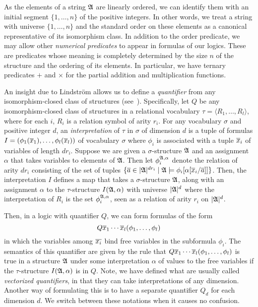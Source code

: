 \documentclass[a4paper,UKenglish,cleveref, autoref, thm-restate, anonymous]{lipics-v2021}
\begin{document}
As the elements of a string $\mathfrak{A}$ are linearly ordered, we can identify them with an initial segment $\{1,\ldots,n\}$ of the positive integers.  In other words, we treat a string with universe $\{1,\ldots,n\}$ and the standard order on these elements as a canonical representative of its isomorphism class.  In addition to the order predicate, we may allow other \emph{numerical predicates} to appear in formulas of our logics.  These are predicates whose meaning is completely determined by the size $n$ of the structure and the ordering of its elements.  In particular, we have ternary predicates $+$ and $\times$ for the partial addition and multiplication functions.

An insight due to Lindstr\"om allows us to define a \emph{quantifier} from any isomorphism-closed class of structures (see~\cite{Ebb85}).  Specifically, let $Q$ be any isomorphism-closed class of structures in a relational vocabulary $\tau = \langle R_1,\ldots,R_l\rangle$, where for each $i$, $R_i$ is a relation symbol of arity $r_i$.  For any vocabulary $\sigma$ and positive integer $d$, an \emph{interpretation} of $\tau$ in $\sigma$ of dimension $d$ is a tuple of formulas $I = (\phi_1(\overline{x}_1),\dots, \phi_l(\overline{x}_l))$ of vocabulary $\sigma$ where $\phi_i$ is associated with a tuple $\overline{x}_i$ of variables of length $dr_i$.  Suppose we are given a $\sigma$-structure $\mathfrak{A}$ and an assignment $\alpha$ that takes variables to elements of $\mathfrak{A}$.  Then let $\phi_i^{\mathfrak{A},\alpha}$ denote the relation of arity $dr_i$ consisting of the set of tuples $\{\overline{a} \in |\mathfrak{A}|^{dr_i} \mid \mathfrak{A} \models \phi_i[\alpha[\overline{x}_i/\overline{a}]] \}$.  Then, the interpretation $I$ defines a map that takes a $\sigma$-structure $\mathfrak{A}$, along with an assignment $\alpha$ to the  $\tau$-structure $I(\mathfrak{A},\alpha)$ with universe $|\mathfrak{A}|^d$ where the interpretation of $R_i$ is the set $\phi_i^{\mathfrak{A},\alpha}$, seen as a relation of arity $r_i$ on $|\mathfrak{A}|^d$.

Then, in a logic with quantifier $Q$, we can form formulas of the form
$$Q \overline{x}_1\cdots \overline{x}_l (\phi_1,\ldots,\phi_l)$$
in which the variables among $\overline{x_i}$ bind free variables in the subformula $\phi_i$.  The semantics of this quantifier are given by the rule that 
$Q \overline{x}_1\cdots \overline{x}_l (\phi_1,\ldots,\phi_l)$ is true in a structure $\mathfrak{A}$ under some interpretation $\alpha$ of values to the free variables if the $\tau$-structure $I(\mathfrak{A},\alpha)$ is in $Q$.  Note, we have defined what are usually called \emph{vectorized quantifiers}, in that they can take interpretations of any dimension.  Another way of formulating this is to have a separate quantifier $Q_d$ for each dimension $d$.  We switch between these notations when it causes no confusion.
\end{document}
